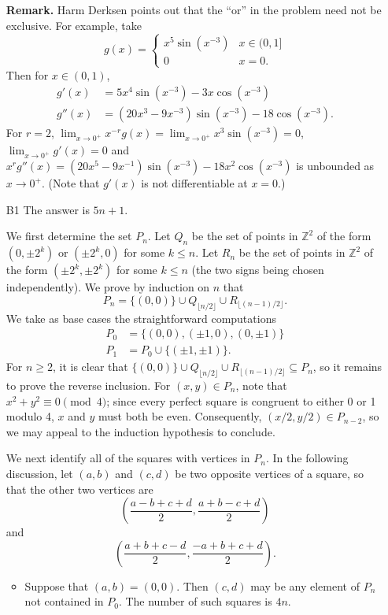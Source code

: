 \documentclass[amssymb,twocolumn,pra,10pt,aps]{revtex4-1}
\begin{document}
\begin{itemize}
\noindent
\textbf{Remark.}
Harm Derksen points out that the ``or'' in the problem need not be exclusive. For example, take
\[
g(x) = \begin{cases} x^5\sin(x^{-3}) & x \in (0,1] \\
0 & x = 0.
\end{cases}
\]
Then for $x \in (0,1)$,
\begin{align*}
g'(x) &= 5x^4\sin(x^{-3})-3x\cos(x^{-3}) \\
g''(x) &=(20x^3-9x^{-3})\sin(x^{-3})-18\cos(x^{-3}).
\end{align*}
For $r=2$, $\lim_{x\to 0^+}x^{-r}g(x)=\lim_{x\to 0^+}x^3\sin(x^{-3})=0$, $\lim_{x\to 0^+}g'(x)=0$ and
$x^rg''(x)=(20x^5-9x^{-1})\sin(x^{-3})-18x^2\cos(x^{-3})$ is unbounded as $x\to 0^+$.
(Note that $g'(x)$ is not differentiable at $x=0$.)

\item[B1]
The answer is $5n+1$.

We first determine the set $P_n$. Let $Q_n$ be the set of points in $\mathbb{Z}^2$ of the form $(0, \pm 2^k)$ or $(\pm 2^k, 0)$ for some $k \leq n$. Let $R_n$ be the set of points in $\mathbb{Z}^2$ of the form $(\pm 2^k, \pm 2^k)$ for some $k \leq n$ (the two signs being chosen independently). 
We prove by induction on $n$ that
\[
P_n = \{(0,0)\} \cup Q_{\lfloor n/2 \rfloor} \cup R_{\lfloor (n-1)/2 \rfloor}.
\]
We take as base cases the straightforward computations
\begin{align*}
P_0 &= \{(0,0), (\pm 1, 0), (0, \pm 1)\} \\
P_1 &= P_0 \cup \{(\pm 1, \pm 1)\}.
\end{align*}
For $n \geq 2$, it is clear that $\{(0,0)\} \cup Q_{\lfloor n/2 \rfloor} \cup R_{\lfloor (n-1)/2 \rfloor} \subseteq P_n$, so it remains to prove the reverse inclusion. For $(x,y) \in P_n$, note that $x^2 + y^2 \equiv 0 \pmod{4}$;
since every perfect square is congruent to either 0 or 1 modulo 4, $x$ and $y$ must both be even. Consequently,
$(x/2, y/2) \in P_{n-2}$, so we may appeal to the induction hypothesis to conclude.

We next identify all of the squares with vertices in $P_n$. In the following discussion, let $(a,b)$
and $(c,d)$ be two opposite vertices of a square, so that the other two vertices are
\[
\left( \frac{a-b+c+d}{2}, \frac{a+b-c+d}{2} \right)
\]
and 
\[
\left( \frac{a+b+c-d}{2}, \frac{-a+b+c+d}{2} \right).
\]
\begin{itemize}
\item
Suppose that $(a,b) = (0,0)$. Then $(c,d)$ may be any element of $P_n$ not contained in $P_0$.
The number of such squares is $4n$.


\end{itemize}
\end{itemize}
\end{document}
